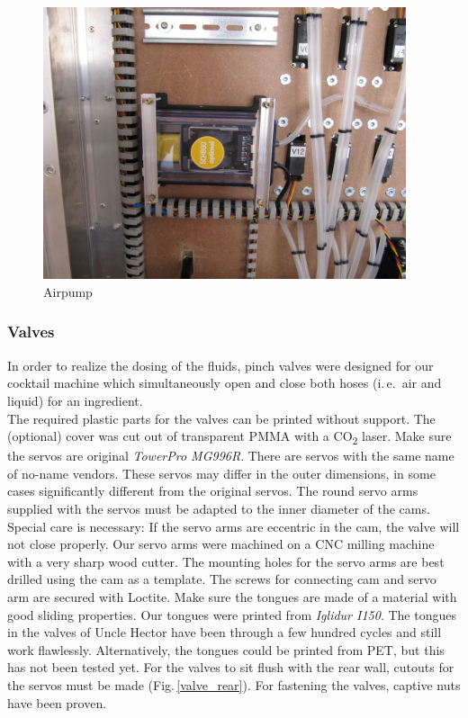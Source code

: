 \documentclass[a4paper]{scrartcl}
\begin{document}
\begin{figure}
  \centering
  \includegraphics[height=8cm]{pics/pump.JPG}
  \caption{Airpump} \label{pump}
\end{figure}
\newpage

\subsubsection{Valves}
In order to realize the dosing of the fluids, pinch valves were designed for our cocktail machine which simultaneously open and close both hoses (i.\,e.~air and liquid) for an ingredient. \\
The required plastic parts for the valves can be printed without support. The (optional) cover was cut out of transparent PMMA with a CO\textsubscript{2} laser. Make sure the servos are original \textit{TowerPro MG996R}.  There are servos with the same name of no-name vendors. These servos may differ in the outer dimensions, in some cases significantly different from the original servos.  The round servo arms supplied with the servos must be adapted to the inner diameter of the cams. Special care is necessary: If the servo arms are eccentric in the cam, the valve will not close properly. Our servo arms were machined on a CNC milling machine with a very sharp wood 
cutter. The mounting holes for the servo arms are best drilled using the cam as a template. The screws for connecting cam and servo arm are secured with Loctite. Make sure the tongues are made of a material with good sliding properties. Our tongues were printed from \textit{Iglidur I150}. The tongues in the valves of Uncle Hector have been through a few hundred cycles and still work flawlessly. Alternatively, the tongues could be printed from PET, but this has not been tested yet. For the valves to sit flush with the rear wall, cutouts for the servos must be made (Fig.\,\ref{valve_rear}). For fastening the valves, captive nuts have been proven.
\end{document}
